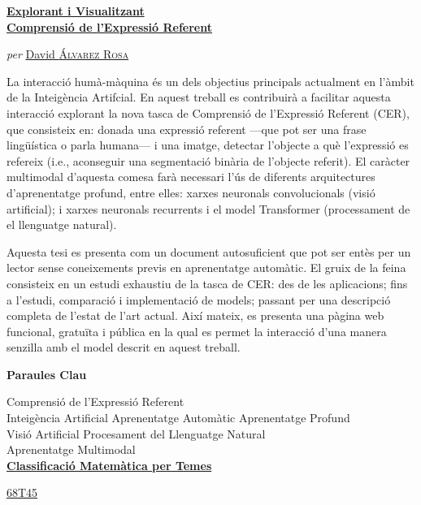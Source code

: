 \clearpage
\thispagestyle{plain}
\null\vfill

\begin{otherlanguage}{catalan}
  \begin{center}
    \Large
    \href{https://recomprehension.com/}{\textbf{Explorant i Visualitzant\\
        Comprensió de l'Expressió Referent}}

    \vspace{2ex} \large \textit{per}
    \href{https://david.alvarezrosa.com/}{David \textsc{Álvarez Rosa}}

    \vspace{3ex} \textbf{\abstractname}
  \end{center}

  \vspace{-2ex}
  \noindent La interacció humà-màquina és un dels objectius principals
  actualment en l'àmbit de la Inte\lgem{}igència Artifcial. En aquest treball
  es contribuirà a facilitar aquesta interacció explorant la nova tasca de
  Comprensió de l'Expressió Referent (CER), que consisteix en: donada una
  expressió referent ---que pot ser una frase lingüística o parla humana--- i
  una imatge, detectar l'objecte a què l'expressió es refereix (i.e.,
  aconseguir una segmentació binària de l'objecte referit). El caràcter
  multimodal d'aquesta comesa farà necessari l'ús de diferents arquitectures
  d'aprenentatge profund, entre elles: xarxes neuronals convolucionals (visió
  artificial); i xarxes neuronals recurrents i el model Transformer
  (processament de el llenguatge natural).

  Aquesta tesi es presenta com un document autosuficient que pot ser entès per
  un lector sense coneixements previs en aprenentatge automàtic. El gruix de la
  feina consisteix en un estudi exhaustiu de la tasca de CER: des de les
  aplicacions; fins a l'estudi, comparació i implementació de models; passant
  per una descripció completa de l'estat de l'art actual. Així mateix, es
  presenta una pàgina web funcional, gratuïta i pública en la qual es permet la
  interacció d'una manera senzilla amb el model descrit en aquest treball.

  \begin{center}


    \bigskip\smallskip \textbf{Paraules Clau}

    Comprensió de l'Expressió Referent\\
    Inte\lgem{}igència Artificial \textbullet{} Aprenentatge Automàtic
    \textbullet{} Aprenentatge Profund\\
    Visió Artificial \textbullet{} Procesament del Llenguatge Natural\\
    Aprenentatge Multimodal\\

    \bigskip
    \href{https://mathscinet.ams.org/msc/msc2010.html}{\textbf{Classificació
        Matemàtica per Temes}}

    \href{https://mathscinet.ams.org/msc/msc2010.html?t=68Txx}{68T45}
  \end{center}
\end{otherlanguage}
\vfill\null{}



